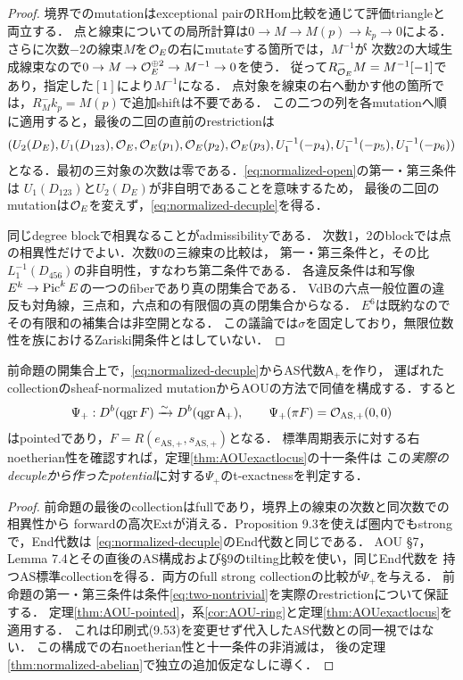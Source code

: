 \begin{proof}
境界でのmutationはexceptional pairのRHom比較を通じて評価triangleと両立する．
点と線束についての局所計算は$0\to M\to M(p)\to k_p\to0$による．
さらに次数$-2$の線束$M$を$\mathcal O_E$の右にmutateする箇所では，$M^{-1}$が
次数2の大域生成線束なので$0\to M\to\mathcal O_E^{\oplus2}\to M^{-1}\to0$を使う．
従って$R^-_{\mathcal O_E}M=M^{-1}[-1]$であり，指定した$[1]$により$M^{-1}$になる．
点対象を線束の右へ動かす他の箇所では，$R^-_M k_p=M(p)$で追加shiftは不要である．
この二つの列を各mutationへ順に適用すると，最後の二回の直前のrestrictionは
\[
 (U_2(D_E),U_1(D_{123}),\mathcal O_E,\mathcal O_E(p_1),\mathcal O_E(p_2),\mathcal O_E(p_3),
 U_1^{-1}(-p_4),U_1^{-1}(-p_5),U_1^{-1}(-p_6))
\]
となる．最初の三対象の次数は零である．\eqref{eq:normalized-open}の第一・第三条件は
$U_1(D_{123})$と$U_2(D_E)$が非自明であることを意味するため，
最後の二回のmutationは$\mathcal O_E$を変えず，\eqref{eq:normalized-decuple}を得る．

同じdegree blockで相異なることがadmissibilityである\cite[Definition 7.1]{AOU}．
次数1，2のblockでは点の相異性だけでよい．次数0の三線束の比較は，
第一・第三条件と，その比$L_1^{-1}(D_{456})$の非自明性，すなわち第二条件である．
各違反条件は和写像$E^k\to\operatorname{Pic}^k E$の一つのfiberであり真の閉集合である．
VdBの六点一般位置の違反も対角線，三点和，六点和の有限個の真の閉集合からなる．
$E^6$は既約なのでその有限和の補集合は非空開となる．
この議論では$\sigma$を固定しており，無限位数性を族におけるZariski開条件とはしていない．
\end{proof}

\begin{corollary}[規格化したAOU型同値への適用]\label{cor:normalized-pointed}
前命題の開集合上で，\eqref{eq:normalized-decuple}からAS代数$\mathsf A_+$を作り，
運ばれたcollectionのsheaf-normalized mutationからAOUの方法で同値を構成する．すると
\[
 \Psi_+:D^b(\operatorname{qgr} F)\xrightarrow{\sim}D^b(\operatorname{qgr}\mathsf A_+),\qquad
 \Psi_+(\pi F)=\mathcal O_{\mathrm{AS},+}(0,0)
\]
はpointedであり，$F=R(e_{\mathrm{AS},+},s_{\mathrm{AS},+})$となる．
標準周期表示に対する右noetherian性を確認すれば，定理\ref{thm:AOUexactlocus}の十一条件は
この\emph{実際のdecupleから作ったpotential}に対する$\Psi_+$のt-exactnessを判定する．
\end{corollary}
\begin{proof}
前命題の最後のcollectionはfullであり，境界上の線束の次数と同次数での相異性から
forwardの高次Extが消える．Proposition 9.3を使えば圏内でもstrongで，End代数は
\eqref{eq:normalized-decuple}のEnd代数と同じである．
AOU \S7，Lemma 7.4とその直後のAS構成および\S9のtilting比較を使い，同じEnd代数を
持つAS標準collectionを得る．両方のfull strong collectionの比較が$\Psi_+$を与える．
前命題の第一・第三条件は条件\eqref{eq:two-nontrivial}を実際のrestrictionについて保証する．
定理\ref{thm:AOU-pointed}，系\ref{cor:AOU-ring}と定理\ref{thm:AOUexactlocus}を適用する．
これは印刷式(9.53)を変更せず代入したAS代数との同一視ではない．
この構成での右noetherian性と十一条件の非消滅は，
後の定理\ref{thm:normalized-abelian}で独立の追加仮定なしに導く．
\end{proof}

